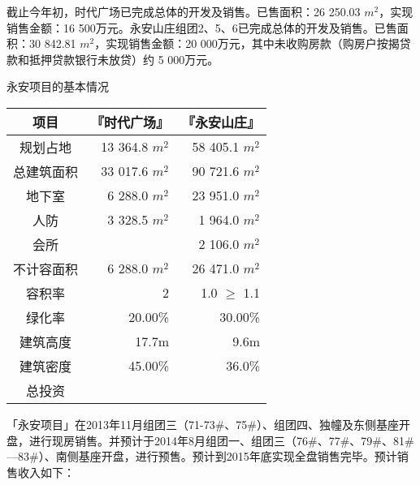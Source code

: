 截止今年初，时代广场已完成总体的开发及销售。已售面积：26 250.03 $m^2$，实现销售金额：16 500万元。永安山庄组团2、5、6已完成总体的开发及销售。已售面积：30 842.81 $m^2$，实现销售金额：20 000万元，其中未收购房款（购房户按揭贷款和抵押贷款银行未放贷）约 5 000万元。
  \begin{center}
  \renewcommand*{\arraystretch}{0.6}
  \setlength{\tabcolsep}{8pt}
  \begin{threeparttable}\vspace{-1.0cm}
 \caption{永安项目的基本情况}
 \renewcommand{\arraystretch}{1.1} \arrayrulewidth=0.8pt \tabcolsep=10pt
 	 \begin{tabular}{>{\footnotesize}c>{\footnotesize}r>{\footnotesize}r}
	\hline\hline
\rowcolor{mycyan}	\bfseries 项目 	& \bfseries 『时代广场』 & \bfseries 『永安山庄』\\
	\hline \renewcommand{\arraystretch}{.8}
规划占地	&	13 364.8 $m^2$	&	58 405.1 $m^2$ \\
总建筑面积	&	33 017.6 $m^2$	&	90 721.6 $m^2$ \\
地下室	&	6 288.0 $m^2$	&	23 951.0 $m^2$ \\
人防	&	3 328.5 $m^2$	&	1 964.0 $m^2$ \\
会所	&		&	2 106.0 $m^2$ \\
不计容面积	&	6 288.0 $m^2$	&	26 471.0 $m^2$ \\
\midrule 
容积率	&	2	&	1.0 $\geq$ 1.1 \\
绿化率	&	20.00\%	&	30.00\% \\
建筑高度	&	17.7m	&	9.6m \\
建筑密度	&	45.00\%	& 	36.0\% \\
\midrule
总投资	&	\multicolumn{2}{c}{\hspace{2em}56 156万元}  \\
	\bottomrule
	\end{tabular}
\end{threeparttable}
\end{center}
「永安项目」在2013年11月组团三（71-73\#、75\#）、组团四、独幢及东侧基座开盘，进行现房销售。并预计于2014年8月组团一、组团三（76\#、77\#、79\#、81\#—83\#）、南侧基座开盘，进行预售。预计到2015年底实现全盘销售完毕。预计销售收入如下：
